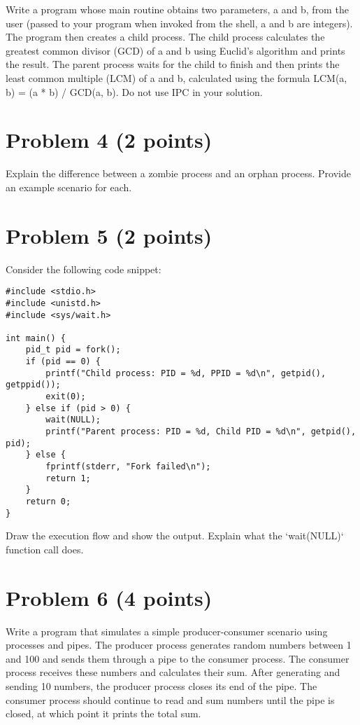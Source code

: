 \documentclass{article}
\begin{document}
Write a program whose main routine obtains two parameters, a and b, from the user (passed to your program when invoked from the shell, a and b are integers). The program then creates a child process. The child process calculates the greatest common divisor (GCD) of a and b using Euclid's algorithm and prints the result. The parent process waits for the child to finish and then prints the least common multiple (LCM) of a and b, calculated using the formula LCM(a, b) = (a * b) / GCD(a, b). Do not use IPC in your solution.


\section*{Problem 4 (2 points)}

Explain the difference between a zombie process and an orphan process. Provide an example scenario for each.


\section*{Problem 5 (2 points)}

Consider the following code snippet:

\begin{verbatim}
#include <stdio.h>
#include <unistd.h>
#include <sys/wait.h>

int main() {
    pid_t pid = fork();
    if (pid == 0) {
        printf("Child process: PID = %d, PPID = %d\n", getpid(), getppid());
        exit(0);
    } else if (pid > 0) {
        wait(NULL);
        printf("Parent process: PID = %d, Child PID = %d\n", getpid(), pid);
    } else {
        fprintf(stderr, "Fork failed\n");
        return 1;
    }
    return 0;
}
\end{verbatim}

Draw the execution flow and show the output. Explain what the `wait(NULL)` function call does.



\section*{Problem 6 (4 points)}

Write a program that simulates a simple producer-consumer scenario using processes and pipes. The producer process generates random numbers between 1 and 100 and sends them through a pipe to the consumer process. The consumer process receives these numbers and calculates their sum.  After generating and sending 10 numbers, the producer process closes its end of the pipe. The consumer process should continue to read and sum numbers until the pipe is closed, at which point it prints the total sum.
\end{document}

